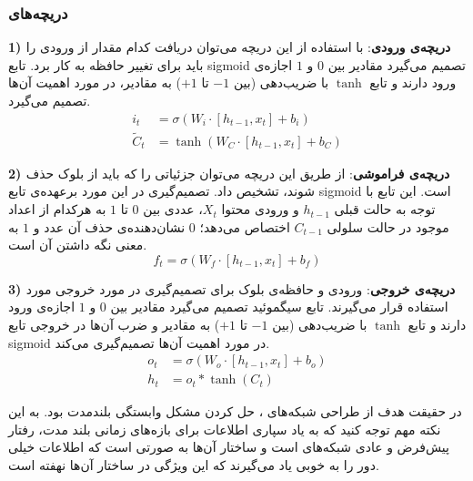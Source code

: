 \subsubsection*{دریچه‌های }
\textbf{1) دریچه‌ی ورودی}:
با استفاده از این دریچه می‌توان دریافت کدام مقدار از ورودی را باید برای تغییر حافظه به کار برد. تابع \gls{sigmoid} تصمیم می‌گیرد مقادیر بین $0$ و $1$ اجازه‌ی ورود دارند و تابع $\tanh$ با ضریب‌دهی (بین $-1$ تا $+1$) به مقادیر، در مورد اهمیت آن‌ها تصمیم می‌گیرد.
 \begin{equation}
  	\begin{aligned}
  		i_t &= \sigma (W_i \cdot [h_{t-1}, x_t]+b_i)
  		\\
  		\tilde{C}_t &= \tanh(W_C \cdot [h_{t-1}, x_t] + b_C)
  	\end{aligned}
 	\label{eq:ch_lr:lstm_in}
 \end{equation}
 
\textbf{2) دریچه‌ی فراموشی}:
 از طریق این دریچه می‌توان جزئیاتی را که باید از بلوک حذف شوند، تشخیص داد. تصمیم‌گیری در این مورد برعهده‌ی تابع \gls{sigmoid} است. این تابع با توجه به حالت قبلی $h_{t-1}$ و ورودی محتوا $X_t$، عددی بین $0$ تا $1$ به هرکدام از اعداد موجود در حالت سلولی $C_{t-1}$ اختصاص می‌دهد؛ $0$ نشان‌دهنده‌ی حذف آن عدد و $1$ به معنی نگه داشتن آن است.
 \begin{equation}
	f_t = \sigma(W_f\cdot [h_{t-1}, x_t] + b_f)
 	\label{eq:ch_lr:lstm_loss}
 \end{equation}
 
\textbf{3) دریچه‌ی خروجی}:
 ورودی و حافظه‌ی بلوک برای تصمیم‌گیری در مورد خروجی مورد استفاده قرار می‌گیرند. تابع سیگموئید تصمیم می‌گیرد مقادیر بین $0$ و $1$ اجازه‌ی ورود دارند و تابع $\tanh$ با ضریب‌دهی (بین $-1$ تا $+1$) به مقادیر و ضرب آن‌ها در خروجی تابع \gls{sigmoid} در مورد اهمیت آن‌ها تصمیم‌گیری می‌کند.
 \begin{equation}
 	\begin{aligned}
 		o_t &= \sigma (W_o \cdot [h_{t-1}, x_t]+b_o)
 		\\
 		h_t &= o_t \ast \tanh(C_t)
 	\end{aligned}
 	\label{eq:ch_lr:lstm_out}
 \end{equation}

 در حقیقت هدف از طراحی شبکه‌های ، حل کردن مشکل وابستگی بلندمدت بود. به این نکته مهم توجه کنید که به یاد سپاری اطلاعات برای بازه‌های زمانی بلند مدت، رفتار پیش‌فرض و عادی شبکه‌های  است و ساختار آ‌ن‌ها به صورتی است که اطلاعات خیلی دور را به خوبی یاد می‌گیرند که این ویژگی در ساختار آن‌ها نهفته است.
 
